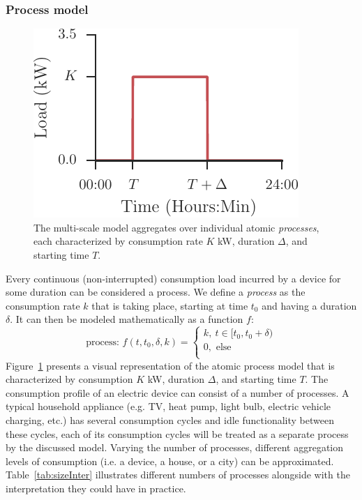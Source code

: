 \documentclass[conference]{IEEEtran}
\begin{document}
\subsubsection{Process model}
\begin{figure}[!b]
\centering
\includegraphics{figures/process.pdf}
\caption{The multi-scale model aggregates over individual atomic \emph{processes}, each characterized by consumption rate $K$ kW, duration $\Delta$, and starting time $T$.}
\label{fig:process}
\end{figure}

Every continuous (non-interrupted) consumption load incurred by a device for some duration can be considered a process.  We define a \emph{process} as the consumption rate $k$ that is taking place, starting at time $t_0$ and having a duration $\delta$. It can then be modeled mathematically as a function $f$:
\begin{equation}
\text{process: }f(t, t_0, \delta, k) =
\left\lbrace
\begin{array}{l}
 k,~t \in [t_0, t_0+\delta)\\
 0, \text{ else}\\
\end{array}
\right.
\end{equation}
Figure~\ref{fig:process} presents a visual representation of the atomic process model that is characterized by consumption $K$ kW, duration $\Delta$, and starting time $T$. The consumption profile of an electric device can consist of a number of processes. A typical household appliance (e.g. TV, heat pump, light bulb, electric vehicle charging, etc.) has several consumption cycles and idle functionality between these cycles, each of its consumption cycles will be treated as a separate process by the discussed model. Varying the number of processes, different aggregation levels of consumption (i.e. a device, a house, or a city) can be approximated. Table~\ref{tab:sizeInter} illustrates different numbers of processes alongside with the interpretation they could have in practice.
\end{document}
